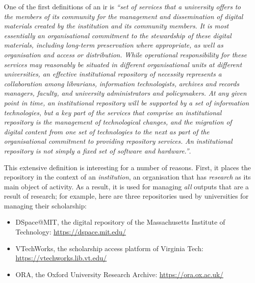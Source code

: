 One of the first definitions of an \gls{ir} is \emph{``set of services that a university offers to the members of its community for the management and dissemination of digital materials created by the institution and its community members. It is most essentially an organisational commitment to the stewardship of these digital materials, including long-term preservation where appropriate, as well as organisation and access or distribution. While operational responsibility for these services may reasonably be situated in different organisational units at different universities, an effective institutional repository of necessity represents a collaboration among librarians, information technologists, archives and records managers, faculty, and university administrators and policymakers. At any given point in time, an institutional repository will be supported by a set of information technologies, but a key part of the services that comprise an institutional repository is the management of technological changes, and the migration of digital content from one set of technologies to the next as part of the organisational commitment to providing repository services. An institutional repository is not simply a fixed set of software and hardware.''}\cite{lynch}.

This extensive definition is interesting for a number of reasons. First, it places the repository in the context of an \emph{institution}, an organisation that has \emph{research} as its main object of activity. As a result, it is used for managing \emph{all} outputs that are a result of research; for example, here are three repositories used by universities for managing their scholarship:
\begin{itemize}
    \item DSpace@MIT, the digital repository of the Massachusetts Institute of Technology: \url{https://dspace.mit.edu/}
    \item VTechWorks, the scholarship access platform of Virginia Tech: \url{https://vtechworks.lib.vt.edu/}
    \item ORA, the Oxford University Research Archive: \url{https://ora.ox.ac.uk/}
\end{itemize}

